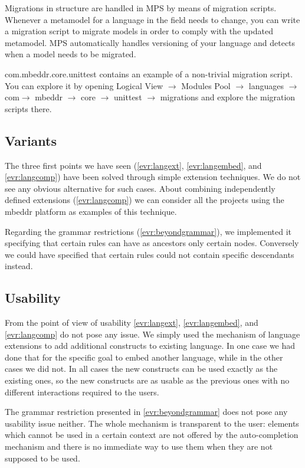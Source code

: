 \documentclass[preprint,numbers,10pt]{sigplanconf}
\begin{document}
Migrations in structure are handled in MPS by means of migration scripts. Whenever a metamodel for a language in the field needs to change, you can write a migration script to migrate models in order to comply with the updated metamodel. MPS automatically handles versioning of your language and detects when a model needs to be migrated.

com.mbeddr.core.unittest contains an example of a non-trivial migration script. You can explore it by opening Logical View $\rightarrow$ Modules Pool $\rightarrow$ languages $\rightarrow$ com$\rightarrow$ mbeddr $\rightarrow$ core $\rightarrow$ unittest $\rightarrow$ migrations and explore the migration scripts there.

\subsection{Variants}

The three first points we have seen (\ref{evr:langext}, \ref{evr:langembed}, and \ref{evr:langcomp}) have been solved through simple extension techniques. We do not see any obvious alternative for such cases. About combining independently defined extensions (\ref{evr:langcomp}) we can consider all the projects using the mbeddr platform as examples of this technique.

Regarding the grammar restrictions (\ref{evr:beyondgrammar}), we implemented it specifying that certain rules can have as ancestors only certain nodes. Conversely we could have specified that certain rules could not contain specific descendants instead.

\subsection{Usability}

From the point of view of usability \ref{evr:langext}, \ref{evr:langembed}, and \ref{evr:langcomp} do not pose any issue. We simply used the mechanism of language extensions to add additional constructs to existing language. In one case we had done that for the specific goal to embed another language, while in the other cases we did not. In all cases the new constructs can be used exactly as the existing ones, so the new constructs are as usable as the previous ones with no different interactions required to the users.

The grammar restriction presented in \ref{evr:beyondgrammar} does not pose any usability issue neither. The whole mechanism is transparent to the user: elements which cannot be used in a certain context are not offered by the auto-completion mechanism and there is no immediate way to use them when they are not supposed to be used.
\end{document}
